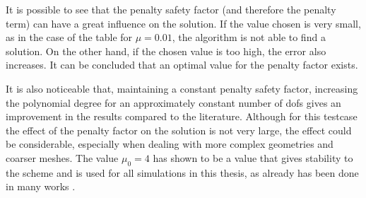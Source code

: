 It is possible to see that the penalty safety factor (and therefore the penalty term) can have a great influence on the solution. If the value chosen is very small, as in the case of the table for $\mu = 0.01$, the algorithm is not able to find a solution. On the other hand, if the chosen value is too high, the error also increases. It can be concluded that an optimal value for the penalty factor exists.

It is also noticeable that, maintaining a constant penalty safety factor, increasing the polynomial degree for an approximately constant number of dofs gives an improvement in the results compared to the literature. Although for this testcase the effect of the penalty factor on the solution is not very large, the effect could be considerable, especially when dealing with more complex geometries and coarser meshes. The value $\mu_0 = 4$ has shown to be a value that gives stability to the scheme and is used for all simulations in this thesis, as already has been done in many works \citep{krauseIncompressibleImmersedBoundary2017,kummerExtendedDiscontinuousGalerkin2017,smudamartinDirectNumericalSimulation2021}.
 

